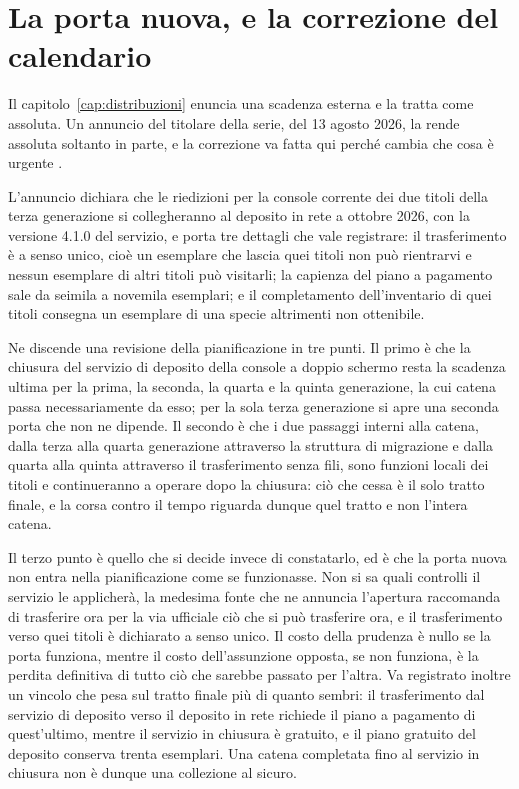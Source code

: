 \section{La porta nuova, e la correzione del calendario}

Il capitolo~\ref{cap:distribuzioni} enuncia una scadenza esterna e la tratta come assoluta. Un annuncio del titolare della serie, del 13 agosto 2026, la rende assoluta soltanto in parte, e la correzione va fatta qui perché cambia che cosa è urgente \cite{frlg-home}.

L'annuncio dichiara che le riedizioni per la console corrente dei due titoli della terza generazione si collegheranno al deposito in rete a ottobre 2026, con la versione 4.1.0 del servizio, e porta tre dettagli che vale registrare: il trasferimento è a senso unico, cioè un esemplare che lascia quei titoli non può rientrarvi e nessun esemplare di altri titoli può visitarli; la capienza del piano a pagamento sale da seimila a novemila esemplari; e il completamento dell'inventario di quei titoli consegna un esemplare di una specie altrimenti non ottenibile.

Ne discende una revisione della pianificazione in tre punti. Il primo è che la chiusura del servizio di deposito della console a doppio schermo resta la scadenza ultima per la prima, la seconda, la quarta e la quinta generazione, la cui catena passa necessariamente da esso; per la sola terza generazione si apre una seconda porta che non ne dipende. Il secondo è che i due passaggi interni alla catena, dalla terza alla quarta generazione attraverso la struttura di migrazione e dalla quarta alla quinta attraverso il trasferimento senza fili, sono funzioni locali dei titoli e continueranno a operare dopo la chiusura: ciò che cessa è il solo tratto finale, e la corsa contro il tempo riguarda dunque quel tratto e non l'intera catena.

Il terzo punto è quello che si decide invece di constatarlo, ed è che la porta nuova non entra nella pianificazione come se funzionasse. Non si sa quali controlli il servizio le applicherà, la medesima fonte che ne annuncia l'apertura raccomanda di trasferire ora per la via ufficiale ciò che si può trasferire ora, e il trasferimento verso quei titoli è dichiarato a senso unico. Il costo della prudenza è nullo se la porta funziona, mentre il costo dell'assunzione opposta, se non funziona, è la perdita definitiva di tutto ciò che sarebbe passato per l'altra. Va registrato inoltre un vincolo che pesa sul tratto finale più di quanto sembri: il trasferimento dal servizio di deposito verso il deposito in rete richiede il piano a pagamento di quest'ultimo, mentre il servizio in chiusura è gratuito, e il piano gratuito del deposito conserva trenta esemplari. Una catena completata fino al servizio in chiusura non è dunque una collezione al sicuro.

